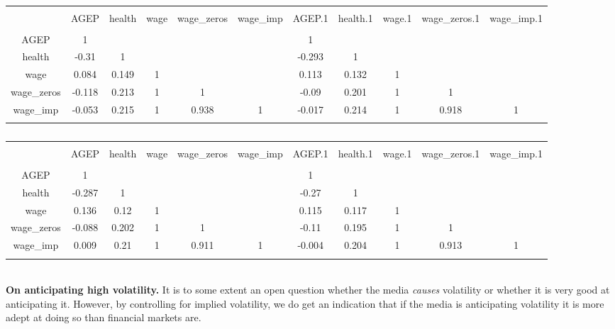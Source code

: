 \documentclass{article}
\begin{document}
	
	\begin{table}[!htbp] \centering 
		\caption{} 
		\label{} 
		\footnotesize
		\begin{tabular}{@{\extracolsep{-3pt}} ccccccccccc} 
			\\[-1.8ex]\hline 
			\hline \\[-1.8ex] 
			& AGEP & health & wage & wage\_zeros & wage\_imp & AGEP.1 & health.1 & wage.1 & wage\_zeros.1 & wage\_imp.1 \\ 
			\hline \\[-1.8ex] 
			AGEP & 1 &  &  &  &  & 1 &  &  &  &  \\ 
			health & -0.31 & 1 &  &  &  & -0.293 & 1 &  &  &  \\ 
			wage & 0.084 & 0.149 & 1 &  &  & 0.113 & 0.132 & 1 &  &  \\ 
			wage\_zeros & -0.118 & 0.213 & 1 & 1 &  & -0.09 & 0.201 & 1 & 1 &  \\ 
			wage\_imp & -0.053 & 0.215 & 1 & 0.938 & 1 & -0.017 & 0.214 & 1 & 0.918 & 1 \\ 
			\hline \\[-1.8ex] 
		\end{tabular} 
	\end{table}
	\begin{table}[!htbp] \centering 
		\caption{} 
		\label{} 
		\footnotesize
		\begin{tabular}{@{\extracolsep{-3pt}} ccccccccccc} 
			\\[-1.8ex]\hline 
			\hline \\[-1.8ex] 
			& AGEP & health & wage & wage\_zeros & wage\_imp & AGEP.1 & health.1 & wage.1 & wage\_zeros.1 & wage\_imp.1 \\ 
			\hline \\[-1.8ex] 
			AGEP & 1 &  &  &  &  & 1 &  &  &  &  \\ 
			health & -0.287 & 1 &  &  &  & -0.27 & 1 &  &  &  \\ 
			wage & 0.136 & 0.12 & 1 &  &  & 0.115 & 0.117 & 1 &  &  \\ 
			wage\_zeros & -0.088 & 0.202 & 1 & 1 &  & -0.11 & 0.195 & 1 & 1 &  \\ 
			wage\_imp & 0.009 & 0.21 & 1 & 0.911 & 1 & -0.004 & 0.204 & 1 & 0.913 & 1 \\ 
			\hline \\[-1.8ex] 
		\end{tabular} 
	\end{table} 
	~\\
	\textbf{On anticipating high volatility.} It is to some extent an open question whether the media \textit{causes} volatility or whether it is very good at anticipating it. However, by controlling for implied volatility, we do get an indication that if the media is anticipating volatility it is more adept at doing so than financial markets are.    
	
\end{document}
